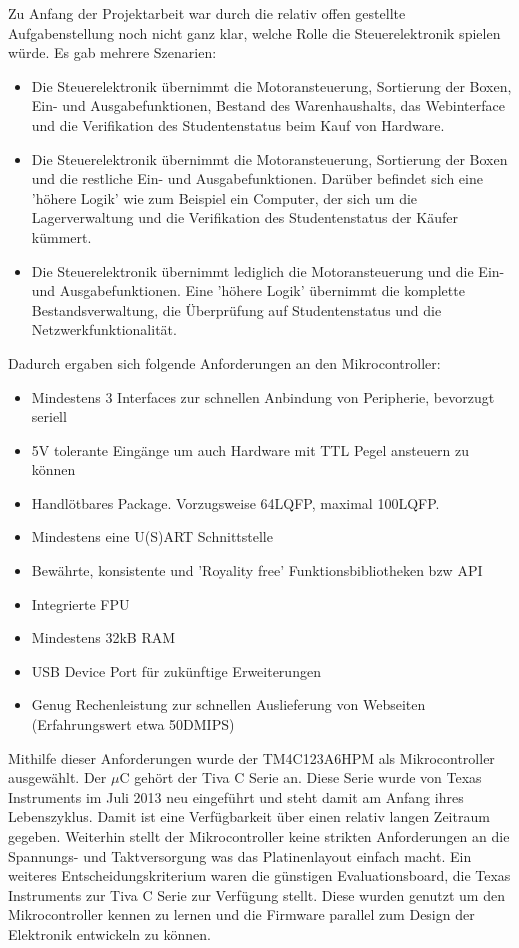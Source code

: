 \documentclass{scrartcl}
\begin{document}
Zu Anfang der Projektarbeit war durch die relativ offen gestellte Aufgabenstellung noch nicht ganz klar, welche Rolle die Steuerelektronik spielen würde. Es gab mehrere Szenarien:
\begin{itemize}
\item{Die Steuerelektronik übernimmt die Motoransteuerung, Sortierung der Boxen, Ein- und Ausgabefunktionen, Bestand des Warenhaushalts, das Webinterface und die Verifikation des Studentenstatus beim Kauf von Hardware.}
\item{Die Steuerelektronik übernimmt die Motoransteuerung, Sortierung der Boxen und die restliche Ein- und Ausgabefunktionen. Darüber befindet sich eine 'höhere Logik' wie zum Beispiel ein Computer, der sich um die Lagerverwaltung und die Verifikation des Studentenstatus der Käufer kümmert.}
\item{Die Steuerelektronik übernimmt lediglich die Motoransteuerung und die Ein- und Ausgabefunktionen. Eine 'höhere Logik' übernimmt die komplette Bestandsverwaltung, die Überprüfung auf Studentenstatus und die Netzwerkfunktionalität.}
\end{itemize} 
Dadurch ergaben sich folgende Anforderungen an den Mikrocontroller:
\begin{itemize}
\item{Mindestens 3 Interfaces zur schnellen Anbindung von Peripherie, bevorzugt seriell}
\item{5V tolerante Eingänge um auch Hardware mit TTL Pegel ansteuern zu können}
\item{Handlötbares Package. Vorzugsweise 64LQFP, maximal 100LQFP.}
\item{Mindestens eine U(S)ART Schnittstelle}
\item{Bewährte, konsistente und 'Royality free' Funktionsbibliotheken bzw API}
\item{Integrierte FPU}
\item{Mindestens 32kB RAM}
\item{USB Device Port für zukünftige Erweiterungen}
\item{Genug Rechenleistung zur schnellen Auslieferung von Webseiten (Erfahrungswert etwa 50DMIPS)}
\end{itemize}
Mithilfe dieser Anforderungen wurde der TM4C123A6HPM als Mikrocontroller ausgewählt. Der $\mu$C gehört der Tiva C Serie an. Diese Serie wurde von Texas Instruments im Juli 2013 neu eingeführt und steht damit am Anfang ihres Lebenszyklus. Damit ist eine Verfügbarkeit über einen relativ langen Zeitraum gegeben. Weiterhin stellt der Mikrocontroller keine strikten Anforderungen an die Spannungs- und Taktversorgung was das Platinenlayout einfach macht. \newline
Ein weiteres Entscheidungskriterium waren die günstigen Evaluationsboard, die Texas Instruments zur Tiva C Serie zur Verfügung stellt. Diese wurden genutzt um den Mikrocontroller kennen zu lernen und die Firmware parallel zum Design der Elektronik entwickeln zu können.\newline
\end{document}
